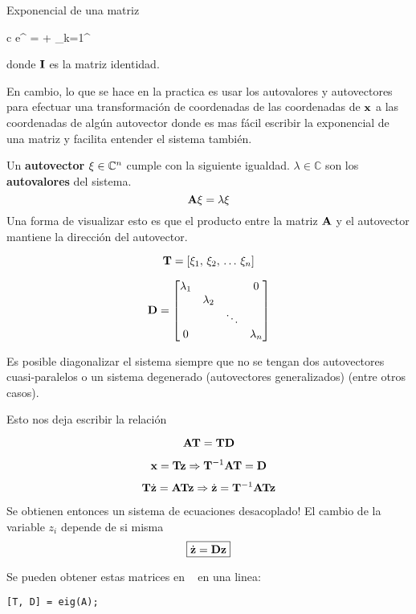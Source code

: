 \documentclass[11pt, a4paper, twoside, openright, openany]{book}
\newcommand{\dimss}{\dimfont{n}}
\begin{document}
\begin{definition}{Exponencial de una matriz}
	\begin{IEEEeqnarray}{c}\label{eq:matrixExponential}
	e^{\MX} = \eye + \sum_{k=1}^{\infty} 
	\end{IEEEeqnarray}
donde $\mathbf{I}$ es la matriz identidad.
\end{definition}

En cambio, lo que se hace en la practica es usar los autovalores y autovectores para efectuar una transformación de coordenadas de las coordenadas de $\mathbf{x}$ a las coordenadas de algún autovector donde es mas fácil escribir la exponencial de una matriz y facilita entender el sistema también.

Un \textbf{autovector} $\Cme{\xi}\in\mathbb{C}^\dimss$ cumple con la siguiente igualdad. $\lambda \in \mathbb{C}$ son los \textbf{autovalores} del sistema.
\[
\mathbf{A}\mathbf{\xi} = \lambda \mathbf{\xi}
\]
Una forma de visualizar esto es que el producto entre la matriz $\mathbf{A}$ y el autovector mantiene la dirección del autovector.

\[
\Mme{T} = \left[ \xi_1,\, \xi_2,\, \ldots\, \xi_\dimss \right]
\]

\[
\Mme{D}= \begin{bmatrix}
\lambda_1 & & & 0 \\
 & \lambda_2 & & \\
  & & \ddots & \\
 0 & & & \lambda_\dimss 
\end{bmatrix}
\]

Es posible diagonalizar el sistema siempre que no se tengan dos autovectores cuasi-paralelos o un sistema degenerado (autovectores generalizados) (entre otros casos). 

Esto nos deja escribir la relación

\[
\mathbf{A} \mathbf{T} = \mathbf{T} \mathbf{D}
\]

\[
\mathbf{x} = \mathbf{T}\mathbf{z} \Rightarrow \mathbf{T}^{-1} \mathbf{A} \mathbf{T} = \mathbf{D}
\]

\[
\mathbf{T} \dot{\mathbf{z}} = \mathbf{A} \mathbf{T} \mathbf{z} \Rightarrow \dot{\mathbf{z}} = \mathbf{T}^{-1} \mathbf{A} \mathbf{T} \mathbf{z}
\]

Se obtienen entonces un sistema de ecuaciones desacoplado! El cambio de la variable $z_i$ depende de si misma
\[
\boxed{\dot{\mathbf{z}} = \mathbf{D} \mathbf{z}}
\]

Se pueden obtener estas matrices en \Matlab~ en una linea:
\begin{lstlisting}
[T, D] = eig(A);
\end{lstlisting}
\end{document}

